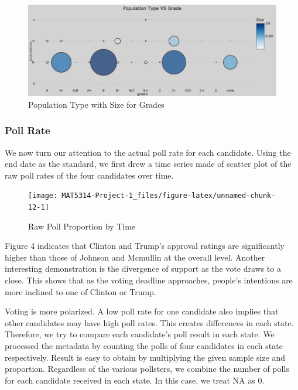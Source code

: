 \documentclass[
  12pt,
]{article}
\begin{document}
\begin{figure}
\centering
\includegraphics{./Figures/popChart.png}
\caption{Population Type with Size for Grades}
\end{figure}

\hypertarget{poll-rate}{%
\subsubsection{Poll Rate}\label{poll-rate}}

We now turn our attention to the actual poll rate for each candidate.
Using the end date as the standard, we first drew a time series made of
scatter plot of the raw poll rates of the four candidates over time.

\begin{minipage}[t]{0.7\textwidth}
\begin{figure}
\texttt{[image: MAT5314-Project-1\_files/figure-latex/unnamed-chunk-12-1]} \caption{Raw Poll Proportion by Time}\label{fig:unnamed-chunk-12}
\end{figure}
\end{minipage}
\begin{minipage}[t]{0.3\textwidth}
\vspace{0pt}
Figure 4 indicates that Clinton and Trump’s approval ratings are significantly higher than those of Johnson and Mcmullin at the overall level. Another interesting demonstration is the divergence of support as the vote draws to a close. This shows that as the voting deadline approaches, people's intentions are more inclined to one of Clinton or Trump.
\end{minipage}

Voting is more polarized. A low poll rate for one candidate also implies
that other candidates may have high poll rates. This creates differences
in each state. Therefore, we try to compare each candidate's poll result
in each state. We processed the metadata by counting the polls of four
candidates in each state respectively. Result is easy to obtain by
multiplying the given sample size and proportion. Regardless of the
various pollsters, we combine the number of polls for each candidate
received in each state. In this case, we treat NA as 0.
\end{document}
